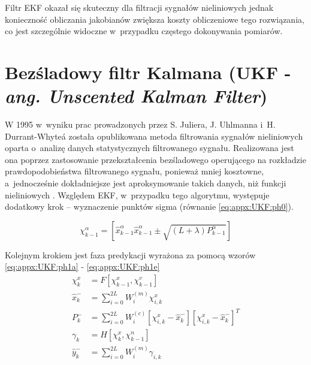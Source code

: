 Filtr EKF okazał się skuteczny dla filtracji sygnałów nieliniowych jednak konieczność obliczania jakobianów zwiększa koszty obliczeniowe tego rozwiązania, co jest szczególnie widoczne w~przypadku częstego dokonywania pomiarów. 
		
		
\section*{Bezśladowy filtr Kalmana (UKF - \emph{ang. Unscented Kalman Filter})}
\label{sec:appx:filters:UKF}
W 1995 w~wyniku prac prowadzonych przez S. Juliera, J. Uhlmanna i~H. Durrant-Whyte\'a została opublikowana \cite{Julier1995} metoda filtrowania sygnałów nieliniowych oparta o~analizę danych statystycznych filtrowanego sygnału. Realizowana jest ona poprzez zastosowanie przekształcenia bezśladowego operującego na rozkładzie prawdopodobieństwa filtrowanego sygnału, ponieważ mniej kosztowne, a~jednocześnie dokładniejsze jest aproksymowanie takich danych, niż funkcji nieliniowych \cite{Uhlmann94}.
Względem EKF, w~przypadku tego algorytmu, występuje dodatkowy krok -- wyznaczenie punktów sigma (równanie \ref{eq:appx:UKF:ph0}). 
		
\begin{equation}
	\chi^\alpha_{k-1} = [\widehat{x}^\alpha_{k-1} \widehat{x}^\alpha_{k-1}\pm\sqrt{(L+\lambda)P^\alpha_{k-1}}] \label{eq:appx:UKF:ph0}
\end{equation}
		
Kolejnym krokiem jest faza predykacji wyrażona za pomocą wzorów \ref{eq:appx:UKF:ph1a} - \ref{eq:appx:UKF:ph1e}
\begin{subequations}
	\begin{align}
		\chi^x_{k}        & = F[\chi^x_{k-1},\chi^v_{k-1}] \label{eq:appx:UKF:ph1a}                                                               \\
		\widehat{x}^-_{k} & = \sum_{i=0}^{2L}W_i^{(m)}\chi^x_{i,k}\label{eq:appx:UKF:ph1b}                                                        \\
		P^-_k             & = \sum_{i=0}^{2L}W_i^{(c)}[\chi^x_{i,k}-\widehat{x}^-_{k}][\chi^x_{i,k}-\widehat{x}^-_{k}]^T \label{eq:appx:UKF:ph1c} \\
		\gamma_k          & = H[\chi^x_k, \chi^n_{k-1}] \label{eq:appx:UKF:ph1d}                                                                  \\
		\widehat{y}^-_{k} & = \sum_{i=0}^{2L}W_i^{(m)}\gamma_{i,k} \label{eq:appx:UKF:ph1e}                                                       
	\end{align}
\end{subequations}
		
